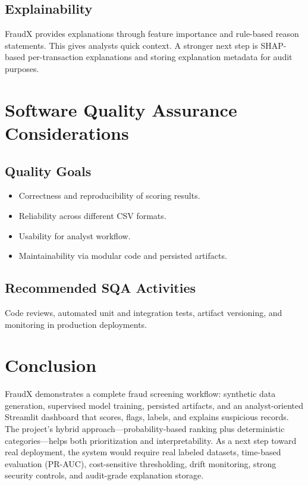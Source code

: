 \documentclass[12pt,a4paper]{report}
\begin{document}
\section{Explainability}
FraudX provides explanations through feature importance and rule-based reason statements. This gives analysts quick context. A stronger next step is SHAP-based per-transaction explanations and storing explanation metadata for audit purposes.

\chapter{Software Quality Assurance Considerations}
\section{Quality Goals}
\begin{itemize}
  \item Correctness and reproducibility of scoring results.
  \item Reliability across different CSV formats.
  \item Usability for analyst workflow.
  \item Maintainability via modular code and persisted artifacts.
\end{itemize}

\section{Recommended SQA Activities}
Code reviews, automated unit and integration tests, artifact versioning, and monitoring in production deployments.

\chapter{Conclusion}
FraudX demonstrates a complete fraud screening workflow: synthetic data generation, supervised model training, persisted artifacts, and an analyst-oriented Streamlit dashboard that scores, flags, labels, and explains suspicious records. The project’s hybrid approach---probability-based ranking plus deterministic categories---helps both prioritization and interpretability. As a next step toward real deployment, the system would require real labeled datasets, time-based evaluation (PR-AUC), cost-sensitive thresholding, drift monitoring, strong security controls, and audit-grade explanation storage.
\end{document}
